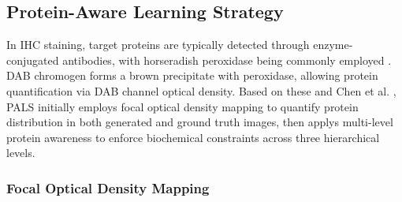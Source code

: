 \documentclass[journal,twoside,web]{ieeecolor}
\begin{document}






\subsection{Protein-Aware Learning Strategy}
In IHC staining, target proteins are typically detected through enzyme-conjugated antibodies, with horseradish peroxidase being commonly employed \cite{harms2023multiplex}.
DAB chromogen forms a brown precipitate with peroxidase, allowing protein quantification via DAB channel optical density. Based on these and Chen et al. \cite{chen2024pathological} , PALS initially employs focal optical density mapping to quantify protein distribution in both generated and ground truth images, then applys multi-level protein awareness to enforce biochemical constraints across three hierarchical levels.


\subsubsection{Focal Optical Density Mapping}
\end{document}

